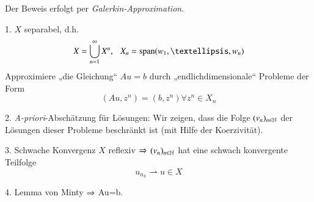 \begin{idea} Der Beweis erfolgt per \textit{Galerkin-Approximation}.
\begin{description}
    \item{1.}
    $X$ separabel, d.h.
    \[
        X=\bigcup_{n=1}^\infty X^n, \qq X_n=\mr{span}(w_1,…,w_n)
    \]
    Approximiere „die Gleichung“ $Au=b$ durch „endlichdimensionale“ Probleme der Form
    \[
        (Au,z^n)=(b,z^n)    \forall z^n\in X_n
    \]
    \item{2. \textit{A-priori}-Abschätzung für Lösungen:}
    Wir zeigen, dass die Folge $(v_n)_{n\in \mathbb{N}}$ der Lösungen dieser Probleme beschränkt ist (mit Hilfe
            der Koerzivität).
    \item{3. Schwache Konvergenz}
    $X$ reflexiv $\Rightarrow$ $(v_n)_{n\in \mathbb{N}}$ hat eine schwach konvergente Teilfolge
    \[
        u_{n_k}\rightharpoonup u \in X
    \]
    \item{4.}
    Lemma von Minty $\Rightarrow$ Au=b.
\end{description}
\[ \]
\end{idea}
